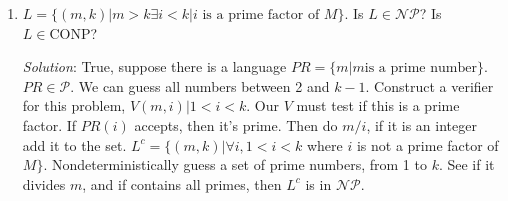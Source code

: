 \documentclass[]{article}
\begin{document}
\begin{enumerate}
\item $L = \{(m, k)|m > k \exists i < k | i \,\,\text{is a prime factor of}\,\,M
\}$. Is $L \in \mathcal{NP}$? Is $L\in\text{CONP}$?
\item[\emph{Solution}:] True, suppose there is a language $PR = \{ m | m
\text{is a prime number}\}$. $PR \in \mathcal{P}$. We can guess all numbers
between 2 and $k - 1$. Construct a verifier for this problem, $V(m, i)| 1 < i <
k$. Our $V$ must test if this is a prime factor. If $PR(i)$ accepts, then it's
prime. Then do $m/i$, if it is an integer add it to the set. $L^c = \{
(m,k)|\forall i, 1 < i < k$ where $i$ is not a prime factor of $M \}$.
Nondeterministically guess a set of prime numbers, from 1 to $k$. See if it
divides $m$, and if contains all primes, then $L^c$ is in $\mathcal{NP}$.
\end{enumerate}
\end{document}
